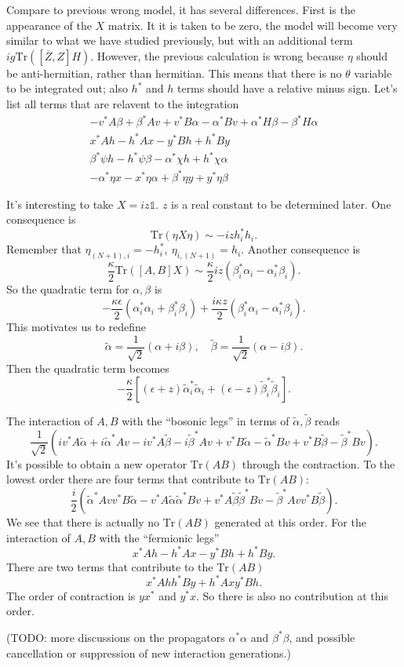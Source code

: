 Compare to previous wrong model, it has several differences.
First is the appearance of the $X$ matrix.
It it is taken to be zero, the model will become very similar to what we have studied previously,
but with an additional term $ ig \mathrm{Tr}\left([\overline{Z},Z]H\right) $.
However, the previous calculation is wrong because $\eta$ should be anti-hermitian, rather than hermitian.
This means that there is no $\theta$ variable to be integrated out;
also $h^*$ and $h$ terms should have a relative minus sign.
Let's list all terms that are relavent to the integration
\begin{align*}
	- v^* A \beta + \beta^* A v + v^* B \alpha - \alpha^* B v + \alpha^* H \beta - \beta^* H \alpha \\
	x^* A h - h^* A x - y^* B h + h^* B y \\
	\beta^* \psi h - h^* \psi \beta - \alpha^* \chi h + h^* \chi \alpha \\
	- \alpha^* \eta x - x^* \eta \alpha + \beta^* \eta y + y^* \eta \beta
\end{align*}

It's interesting to take $X = i z \mathds{1}$.
$z$ is a real constant to be determined later.
One consequence is
\[
	\mathrm{Tr}\left(\eta X \eta\right) \sim - i z h_i^* h_i
.\] 
Remember that $\eta_{(N+1),i} = -h_i^*,~ \eta_{i,(N+1)} = h_i$.
Another consequence is
\[
	\frac{\kappa}{2} \mathrm{Tr}\left([A,B]X\right) \sim \frac{\kappa}{2} iz (\beta_i^* \alpha_i - \alpha_i^* \beta_i)
.\] 
So the quadratic term for $\alpha,\beta$ is
\[
 - \frac{\kappa \epsilon}{2} (\alpha^*_i \alpha_i + \beta_i^* \beta_i) 
 + \frac{i \kappa z}{2} (\beta_i^*\alpha_i - \alpha_i^* \beta_i)
.\] 
This motivates us to redefine
\[
	\tilde{\alpha} = \frac{1}{\sqrt{2}} (\alpha + i\beta),\quad 
	\tilde{\beta} = \frac{1}{\sqrt{2}} (\alpha - i\beta)
.\] 
Then the quadratic term becomes
\[
	- \frac{\kappa}{2} \left[(\epsilon + z) \tilde{\alpha}^*_i \tilde{\alpha}_i 
	+ (\epsilon - z) \tilde{\beta}^*_i \tilde{\beta}_i\right]
.\] 

The interaction of $A,B$ with the ``bosonic legs'' in terms of $\tilde{\alpha},\tilde{\beta}$ reads
\[
	\frac{1}{\sqrt{2}} \left( i v^* A \tilde{\alpha} + i \tilde{\alpha}^* A v
	- i v^* A \tilde{\beta} - i \tilde{\beta}^* A v
+ v^* B \tilde{\alpha} - \tilde{\alpha}^* B v
+ v^* B \tilde{\beta} - \tilde{\beta}^* B v\right)
.\] 
It's possible to obtain a new operator $\mathrm{Tr}(AB)$ through the contraction.
To the lowest order there are four terms that contribute to $\mathrm{Tr}(AB)$:
\[
	\frac{i}{2}\left(\tilde{\alpha}^* A v v^* B \tilde{\alpha}
	- v^* A \tilde{\alpha} \tilde{\alpha}^* B v
+v^* A \tilde{\beta} \tilde{\beta}^* B v
- \tilde{\beta}^* A v v^* B \tilde{\beta}\right)
.\] 
We see that there is actually no $\mathrm{Tr}(AB)$ generated at this order.
For the interaction of $A,B$ with the ``fermionic legs''
\[
x^* A h - h^* A x - y^* B h + h^* B y
.\] 
There are two terms that contribute to the $\mathrm{Tr}(AB)$
\[
	x^* A h h^* B y + h^* A x y^* B h
.\] 
The order of contraction is $y x^*$ and $y^* x$.
So there is also no contribution at this order.

(TODO: more discussions on the propagators $\alpha^* \alpha$ and $\beta^* \beta$, and possible cancellation or suppression of new interaction generations.)
